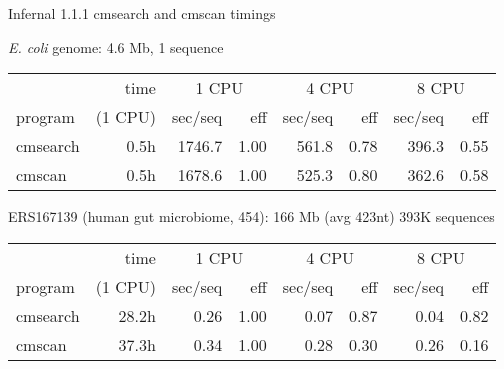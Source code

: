 \documentclass[landscape]{slides}
\begin{document}
\begin{slide}
\begin{center}
Infernal 1.1.1 cmsearch and cmscan timings
\medskip

\tt

\tiny
\emph{E. coli} genome: 4.6 Mb, 1 sequence


\begin{tabular}{l|r|rr|rr|rr}
         & time    & \multicolumn{2}{c}{1 CPU} & \multicolumn{2}{c}{4 CPU} & \multicolumn{2}{c}{8 CPU} \\ \cline{3-8}
program  & (1 CPU) & sec/seq & eff & sec/seq & eff & sec/seq & eff \\ \hline
cmsearch &     0.5h& 1746.7 & 1.00 & 561.8 & 0.78 & 396.3 & 0.55 \\
cmscan   &     0.5h & 1678.6 & 1.00 & 525.3 & 0.80 & 362.6 & 0.58 \\
\end{tabular}

\medskip

\medskip

ERS167139 (human gut microbiome, 454): 166 Mb (avg 423nt) 393K sequences 

\begin{tabular}{l|r|rr|rr|rr}
         & time    & \multicolumn{2}{c}{1 CPU} & \multicolumn{2}{c}{4 CPU} & \multicolumn{2}{c}{8 CPU} \\ \cline{3-8}
program  & (1 CPU) & sec/seq & eff & sec/seq & eff & sec/seq & eff \\ \hline
cmsearch &  28.2h   & 0.26 & 1.00 &     0.07  & 0.87 &     0.04  & 0.82 \\
cmscan   &  37.3h   & 0.34 & 1.00 &     0.28  & 0.30 &     0.26  & 0.16 \\

\end{tabular}


\end{center}
\end{slide}
\end{document}
